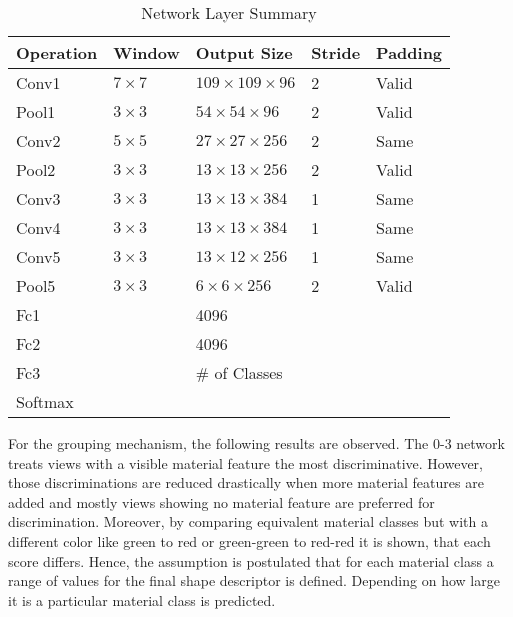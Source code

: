 \begin{table}[]
\centering
\caption{Network Layer Summary}
\label{tab:network-layers}
	\begin{tabular}{lllll}
		Operation & Window       & Output Size                & Stride & Padding \\ \hline
		Conv1     & $7 \times 7$ & $109 \times 109 \times 96$ & 2      & Valid   \\
		Pool1     & $3 \times 3$ & $54 \times 54 \times 96$   & 2      & Valid   \\ \hline
		Conv2     & $5 \times 5$ & $27 \times 27 \times 256$  & 2      & Same    \\
		Pool2     & $3 \times 3$ & $13 \times 13 \times 256$  & 2      & Valid   \\ \hline
		Conv3     & $3 \times 3$ & $13 \times 13 \times 384$  & 1      & Same    \\ \hline
		Conv4     & $3 \times 3$ & $13 \times 13 \times 384$  & 1      & Same    \\ \hline
		Conv5     & $3 \times 3$ & $13 \times 12 \times 256$  & 1      & Same    \\
		Pool5     & $3 \times 3$ & $6 \times 6 \times 256$    & 2      & Valid   \\ \hline
		Fc1       &              & 4096                       &        &         \\ \hline
		Fc2       &              & 4096                       &        &         \\ \hline
		Fc3       &              & \# of Classes              &        &         \\ \hline
		Softmax   &              &                            &        &         \\ \hline
	\end{tabular}
\end{table}

For the grouping mechanism, the following results are observed.
The 0-3 network treats views with a visible material feature the most discriminative.
However, those discriminations are reduced drastically when more material features are added and mostly views showing no material feature are preferred for discrimination.
Moreover, by comparing equivalent material classes but with a different color like green to red or green-green to red-red it is shown, that each score differs.
Hence, the assumption is postulated that for each material class a range of values for the final shape descriptor is defined.
Depending on how large it is a particular material class is predicted.

